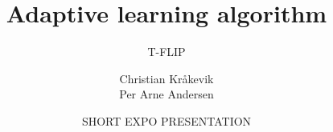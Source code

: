 \documentclass{beamer}
\title{Adaptive learning algorithm}
\subtitle{T-FLIP}
\author{Christian Kråkevik \\ Per Arne Andersen}
\institute[UNIVERSITY OF AGDER]{
  FACULTY OF ENGINEERING AND SCIENCE -- ICT}
\date[Nov 2015]{
  SHORT EXPO PRESENTATION}
\begin{document}
    \begin{frame}
        \maketitle
    \end{frame}


    
\end{document}
